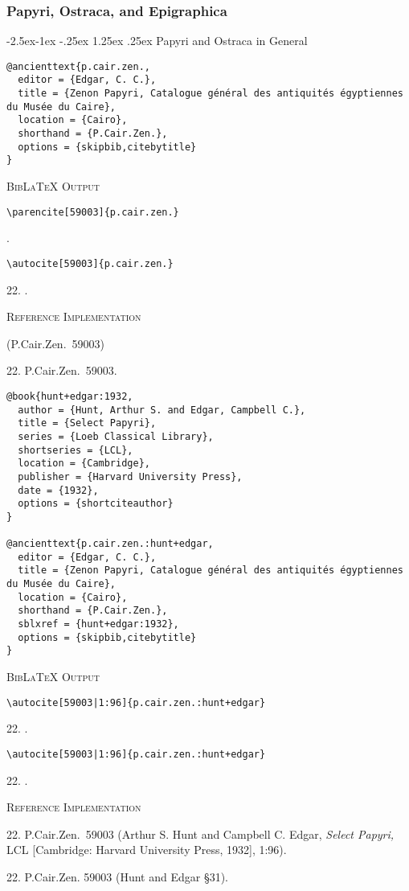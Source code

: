 \documentclass[a4paper]{article}
\makeatletter
\renewcommand\paragraph{\@startsection{paragraph}{4}{\z@}%
            {-2.5ex\@plus -1ex \@minus -.25ex}%
            {1.25ex \@plus .25ex}%
            {\normalfont\normalsize\bfseries}}
\newcommand\citetestnb[5]{%
  {\textsc{BibLaTeX Output}\par
   \nobreak
   \texttt{\textbackslash autocite[#2]\{#5\}}\par
   \color{biblatex-colour}
   #1. \cite[#2]{#5}.\par
   \color{black}
   \texttt{\textbackslash autocite[#2]\{#5\}}\par
   \color{biblatex-colour}
   #3. \cite[#4]{#5}.}}
\newenvironment{refimp}{%
  \begin{minipage}{\linewidth}
    \setlength{\parskip}{1ex}
    \textsc{Reference Implementation}\par
    \nobreak
    \color{reference-colour}
}{\end{minipage}}
\makeatother
\begin{document}
\subsubsection{Papyri, Ostraca, and Epigraphica}

\paragraph{Papyri and Ostraca in General}

\begin{lstlisting}
@ancienttext{p.cair.zen.,
  editor = {Edgar, C. C.},
  title = {Zenon Papyri, Catalogue général des antiquités égyptiennes du Musée du Caire},
  location = {Cairo},
  shorthand = {P.Cair.Zen.},
  options = {skipbib,citebytitle}
}
\end{lstlisting}

{\textsc{BibLaTeX Output}\par
  \nobreak
  \texttt{\textbackslash parencite[59003]\{p.cair.zen.\}}\par
  \color{biblatex-colour}
  \parencite[59003]{p.cair.zen.}.\par
  \color{black}
  \texttt{\textbackslash autocite[59003]\{p.cair.zen.\}}\par
  \color{biblatex-colour}
22. \cite[59003]{p.cair.zen.}.\par}

\begin{refimp}
  (P.Cair.Zen.\ 59003)

  22. P.Cair.Zen.\ 59003.
\end{refimp}

\begin{lstlisting}
@book{hunt+edgar:1932,
  author = {Hunt, Arthur S. and Edgar, Campbell C.},
  title = {Select Papyri},
  series = {Loeb Classical Library},
  shortseries = {LCL},
  location = {Cambridge},
  publisher = {Harvard University Press},
  date = {1932},
  options = {shortciteauthor}
}

@ancienttext{p.cair.zen.:hunt+edgar,
  editor = {Edgar, C. C.},
  title = {Zenon Papyri, Catalogue général des antiquités égyptiennes du Musée du Caire},
  location = {Cairo},
  shorthand = {P.Cair.Zen.},
  sblxref = {hunt+edgar:1932},
  options = {skipbib,citebytitle}
}
\end{lstlisting}

\citetestnb{22}{59003|1:96}{22}{59003|§31}{p.cair.zen.:hunt+edgar}

\begin{refimp}
  22. P.Cair.Zen.\ 59003 (Arthur S. Hunt and Campbell C. Edgar, \emph{Select
  Papyri,} LCL [Cambridge: Harvard University Press, 1932], 1:96).

  22. P.Cair.Zen. 59003 (Hunt and Edgar §31).
\end{refimp}
\end{document}
